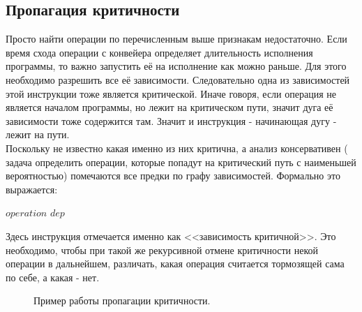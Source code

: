 \documentclass[a4paper,12pt,titlepage]{article}
\begin{document}
\subsection{Пропагация критичности}
\label{chap:Propogation}
Просто найти операции по перечисленным выше признакам недостаточно. Если время схода операции с конвейера определяет длительность исполнения программы, то важно запустить её на исполнение как можно раньше. Для этого необходимо разрешить все её зависимости. Следовательно одна из зависимостей этой инструкции тоже является критической. Иначе говоря, если операция не является началом программы, но лежит на критическом пути, значит дуга её зависимости тоже содержится там. Значит и инструкция - начинающая дугу - лежит на пути.\\
Поскольку не известно какая именно из них критична, а анализ консервативен ( задача определить операции, которые попадут на критический путь с наименьшей вероятностью) помечаются все предки по графу зависимостей. Формально это выражается:
\begin{algorithmic}
 { $operation$ }
		\State {} {$dep$}
	\EndFor
\EndFunction
\end{algorithmic}
Здесь инструкция отмечается именно как <<зависимость критичной>>. Это необходимо, чтобы при такой же рекурсивной отмене критичности некой операции в дальнейшем, различать, какая операция считается тормозящей сама по себе, а какая - нет.
\begin{figure}[h]
\centering

\caption{Пример работы пропагации критичности.}
\label{fig:crit-propogation}
\end{figure}
\end{document}
